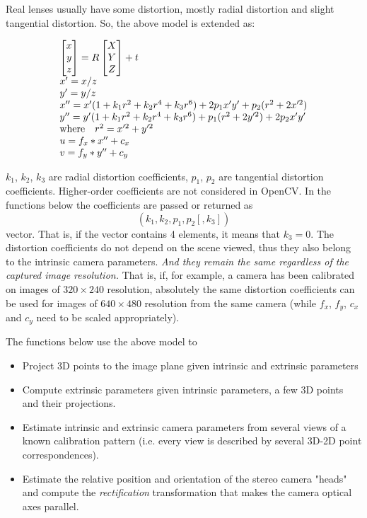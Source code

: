 Real lenses usually have some distortion, mostly
radial distortion and slight tangential distortion. So, the above model
is extended as:

\[
\begin{array}{l}
\begin{bmatrix} x\\ y\\ z \end{bmatrix} = R \begin{bmatrix} X\\ Y\\ Z \end{bmatrix} + t\\
x' = x/z\\
y' = y/z\\
x'' = x' (1 + k_1 r^2 + k_2 r^4 + k_3 r^6) + 2 p_1 x' y' + p_2(r^2 + 2 x'^2) \\
y'' = y' (1 + k_1 r^2 + k_2 r^4 + k_3 r^6) + p_1 (r^2 + 2 y'^2) + 2 p_2 x' y' \\
\text{where} \quad r^2 = x'^2 + y'^2 \\
u = f_x*x'' + c_x\\
v = f_y*y'' + c_y
\end{array}
\]

$k_1$, $k_2$, $k_3$ are radial distortion coefficients, $p_1$, $p_2$ are tangential distortion coefficients.
Higher-order coefficients are not considered in OpenCV. In the functions below the coefficients are passed or returned as
\[ (k_1, k_2, p_1, p_2[, k_3]) \]vector. That is, if the vector contains 4 elements, it means that $k_3=0$.
The distortion coefficients do not depend on the scene viewed, thus they also belong to the intrinsic camera parameters.
\emph{And they remain the same regardless of the captured image resolution.}
That is, if, for example, a camera has been calibrated on images of $320
\times 240$ resolution, absolutely the same distortion coefficients can
be used for images of $640 \times 480$ resolution from the same camera (while $f_x$,
$f_y$, $c_x$ and $c_y$ need to be scaled appropriately).

The functions below use the above model to

\begin{itemize}
 \item Project 3D points to the image plane given intrinsic and extrinsic parameters
 \item Compute extrinsic parameters given intrinsic parameters, a few 3D points and their projections.
 \item Estimate intrinsic and extrinsic camera parameters from several views of a known calibration pattern (i.e. every view is described by several 3D-2D point correspondences).
 \item Estimate the relative position and orientation of the stereo camera "heads" and compute the \emph{rectification} transformation that makes the camera optical axes parallel.
\end{itemize}

